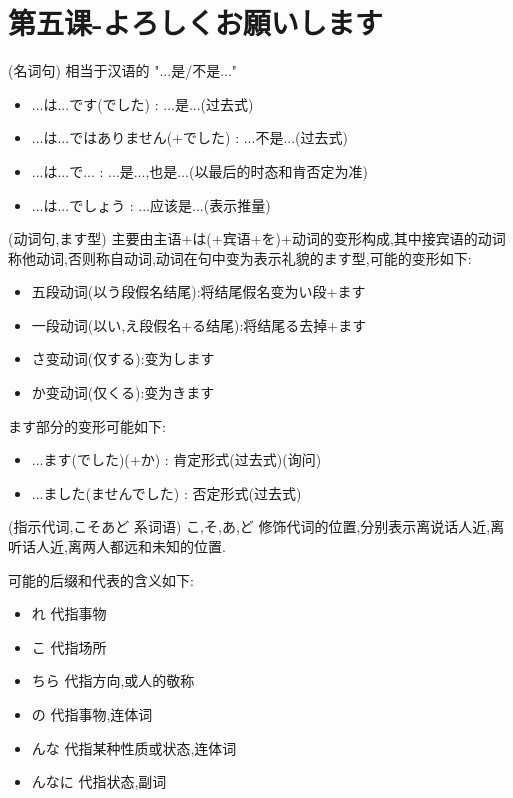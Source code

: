 
\usepackage{../../lectures_preamble}


    \section{第五课-よろしくお願いします}
    \begin{definition}
        (名词句) 相当于汉语的 "...是/不是..."
        \begin{itemize}
            \item ...は...です(でした) : ...是...(过去式)
            \item ...は...ではありません(+でした) : ...不是...(过去式)
            \item ...は...で... : ...是...,也是...(以最后的时态和肯否定为准)
            \item ...は...でしょう : ...应该是...(表示推量)
        \end{itemize}
    \end{definition}
    \begin{definition}
        (动词句,ます型) 主要由主语+は(+宾语+を)+动词的变形构成,其中接宾语的动词称他动词,否则称自动词,动词在句中变为表示礼貌的ます型,可能的变形如下:
        \begin{itemize}
            \item 五段动词(以う段假名结尾):将结尾假名变为い段+ます
            \item 一段动词(以い,え段假名+る结尾):将结尾る去掉+ます
            \item さ变动词(仅する):变为します
            \item か变动词(仅くる):变为きます
        \end{itemize}
        ます部分的变形可能如下:
        \begin{itemize}
            \item ...ます(でした)(+か) : 肯定形式(过去式)(询问)
            \item ...ました(ませんでした) : 否定形式(过去式)
        \end{itemize}
    \end{definition}
    \begin{definition}
        (指示代词,こそあど 系词语) こ,そ,あ,ど 修饰代词的位置,分别表示离说话人近,离听话人近,离两人都远和未知的位置.

        可能的后缀和代表的含义如下:
        \begin{itemize}
            \item れ 代指事物
            \item こ 代指场所
            \item ちら 代指方向,或人的敬称
            \item の 代指事物,连体词
            \item んな 代指某种性质或状态,连体词
            \item んなに 代指状态,副词
        \end{itemize}
    \end{definition}
